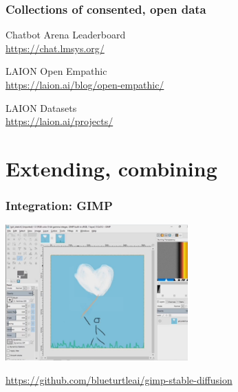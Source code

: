 \documentclass[17pt,aspectratio=169,hyperref={pdfusetitle,colorlinks,allcolors=olive}]{beamer}
\begin{document}
\begin{frame}[fragile]
  \frametitle{Collections of consented, open data}

  Chatbot Arena Leaderboard \\
  \url{https://chat.lmsys.org/}

  LAION Open Empathic \\
  \url{https://laion.ai/blog/open-empathic/}

  LAION Datasets \\
  \url{https://laion.ai/projects/}
\end{frame}



\section{Extending, combining}

\begin{frame}[fragile]
  \frametitle{Integration: GIMP}

    \begin{center}
    \includegraphics[width=7cm]{figs/sd-gimp}
  \end{center}

  \begin{flushright}
    {\scriptsize
    \url{https://github.com/blueturtleai/gimp-stable-diffusion} \\
    }
  \end{flushright}
  
\end{frame}
\end{document}
